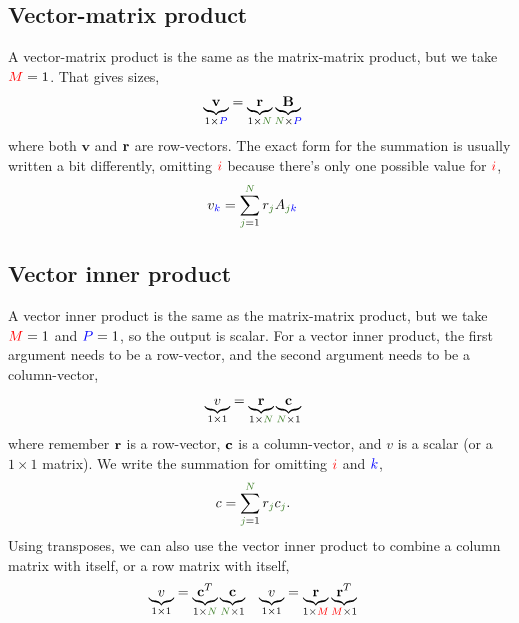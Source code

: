\documentclass{article}
\newcommand{\B}{\mathbf{B}}
\begin{document}
\subsection{Vector-matrix product}
A vector-matrix product is the same as the matrix-matrix product, but we take $\M=1$.
That gives sizes,
\begin{align}
  \underbrace{\mathbf{v}}_{1 \times \P} &= \underbrace{\r}_{1 \times \N} \underbrace{\B}_{\N \times \P}
\end{align}
where both $\mathbf{v}$ and $\r$ are row-vectors.
The exact form for the summation is usually written a bit differently, omitting $\i$ because there's only one possible value for $\i$,
\begin{align}
  v_{\k} &= \sum_{\j=1}^{\N} r_{\j} A_{\j\k}
\end{align}

\subsection{Vector inner product}
A vector inner product is the same as the matrix-matrix product, but we take $\M=1$ and $\P=1$, so the output is scalar.
For a vector inner product, the first argument needs to be a row-vector, and the second argument needs to be a column-vector,
\begin{align}
  \underbrace{v}_{1 \times 1} &= \underbrace{\r}_{1 \times \N} \underbrace{\c}_{\N \times 1}
\end{align}
where remember $\r$ is a row-vector,  $\c$ is a column-vector, and $v$ is a scalar (or a $1\times 1$ matrix).
We write the summation for omitting $\i$ and $\k$,
\begin{align}
  c &= \sum_{\j=1}^{\N} r_{\j} c_{\j}.
\end{align}
Using transposes, we can also use the vector inner product to combine a column matrix with itself, or a row matrix with itself,
\begin{align}
  \underbrace{v}_{1 \times 1} &= \underbrace{\c^T}_{1 \times \N} \underbrace{\c}_{\N \times 1} & 
  \underbrace{v}_{1 \times 1} &= \underbrace{\r}_{1 \times \M} \underbrace{\r^T}_{\M \times 1}
\end{align}
\end{document}
